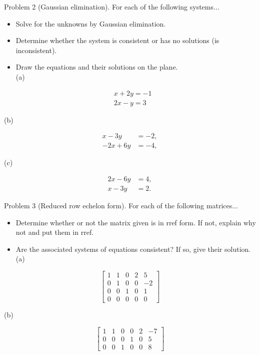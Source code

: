 \documentclass[10pt]{article}
\begin{document}
Problem 2 (Gaussian elimination). For each of the following systems...

\begin{itemize}
  \item Solve for the unknowns by Gaussian elimination.
  \item Determine whether the system is consistent or has no solutions (is inconsistent).
  \item Draw the equations and their solutions on the plane.\\
(a)
\end{itemize}

$$
\begin{aligned}
& x+2 y=-1 \\
& 2 x-y=3
\end{aligned}
$$

(b)

$$
\begin{aligned}
x-3 y & =-2, \\
-2 x+6 y & =-4,
\end{aligned}
$$

(c)

$$
\begin{aligned}
2 x-6 y & =4, \\
x-3 y & =2 .
\end{aligned}
$$

Problem 3 (Reduced row echelon form). For each of the following matrices...

\begin{itemize}
  \item Determine whether or not the matrix given is in rref form. If not, explain why not and put them in rref.
  \item Are the associated systems of equations consistent? If so, give their solution.\\
(a)
\end{itemize}

$$
\left[\begin{array}{cccc|c}
1 & 1 & 0 & 2 & 5 \\
0 & 1 & 0 & 0 & -2 \\
0 & 0 & 1 & 0 & 1 \\
0 & 0 & 0 & 0 & 0
\end{array}\right]
$$

(b)

$$
\left[\begin{array}{ccccc|c}
1 & 1 & 0 & 0 & 2 & -7 \\
0 & 0 & 0 & 1 & 0 & 5 \\
0 & 0 & 1 & 0 & 0 & 8
\end{array}\right]
$$
\end{document}
